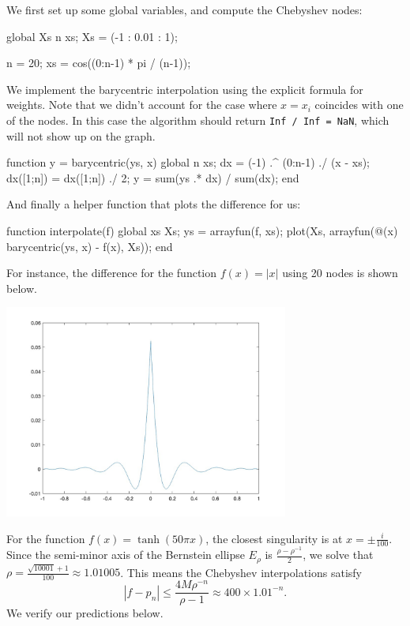 \documentclass{homework}
\begin{document}
\begin{problem}
We first set up some global variables, and compute the Chebyshev nodes:
\begin{matlab}
global Xs n xs;
Xs = (-1 : 0.01 : 1);

n = 20;
xs = cos((0:n-1) * pi / (n-1));
\end{matlab}
We implement the barycentric interpolation using the explicit formula for weights. Note that we didn't account for the case where \(x = x_i\) coincides with one of the nodes. In this case the algorithm should return \texttt{Inf / Inf = NaN}, which will not show up on the graph.
\begin{matlab}
function y = barycentric(ys, x)
  global n xs;
  dx = (-1) .^ (0:n-1) ./ (x - xs);
  dx([1;n]) = dx([1;n]) ./ 2;
  y = sum(ys .* dx) / sum(dx);
end
\end{matlab}
And finally a helper function that plots the difference for us:
\begin{matlab}
function interpolate(f)
  global xs Xs;
  ys = arrayfun(f, xs);
  plot(Xs, arrayfun(@(x) barycentric(ys, x) - f(x), Xs));
end
\end{matlab}
For instance, the difference for the function \(f(x) = |x|\) using 20 nodes is shown below.
\begin{center}
\includegraphics[width=0.7\textwidth]{Hw3-Fig1.jpg}
\end{center}

For the function \(f(x) = \tanh(50\pi x)\), the closest singularity is at \(x = \pm \frac{i}{100}\). Since the semi-minor axis of the Bernstein ellipse \(E_\rho\) is \(\frac{\rho - \rho^{-1}}{2}\), we solve that \(\rho = \frac{\sqrt{10001} + 1}{100} \approx 1.01005\).
This means the Chebyshev interpolations satisfy
\[|f - p_n| \le \frac{4 M \rho^{-n}}{\rho - 1}
\approx 400 \times 1.01^{-n}.\]
We verify our predictions below.


\end{problem}
\end{document}
